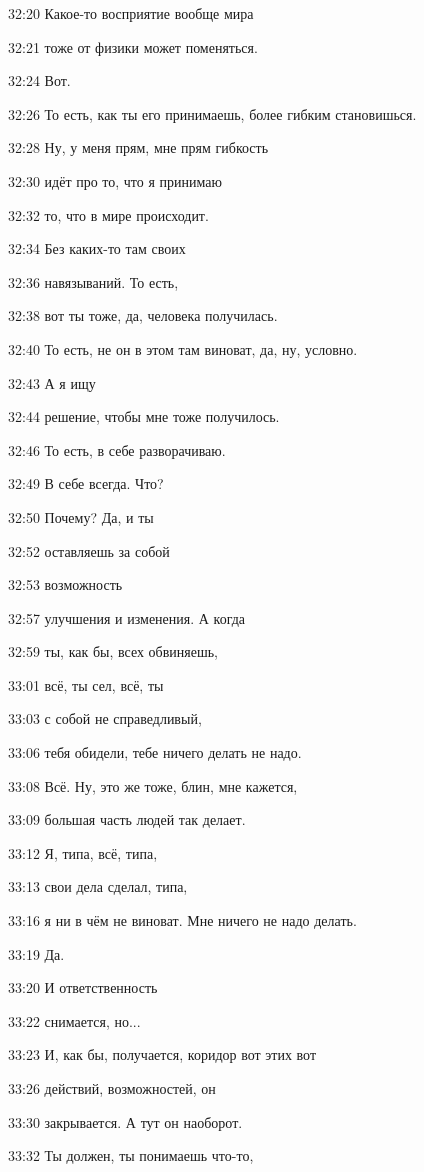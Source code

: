 32:20
Какое-то восприятие вообще мира

32:21
тоже от физики может поменяться.

32:24
Вот.

32:26
То есть, как ты его принимаешь, более гибким становишься.

32:28
Ну, у меня прям, мне прям гибкость

32:30
идёт про то, что я принимаю

32:32
то, что в мире происходит.

32:34
Без каких-то там своих

32:36
навязываний. То есть,

32:38
вот ты тоже, да, человека получилась.

32:40
То есть, не он в этом там виноват, да, ну, условно.

32:43
А я ищу

32:44
решение, чтобы мне тоже получилось.

32:46
То есть, в себе разворачиваю.

32:49
В себе всегда. Что?

32:50
Почему? Да, и ты

32:52
оставляешь за собой

32:53
возможность

32:57
улучшения и изменения. А когда

32:59
ты, как бы, всех обвиняешь,

33:01
всё, ты сел, всё, ты

33:03
с собой не справедливый,

33:06
тебя обидели, тебе ничего делать не надо.

33:08
Всё. Ну, это же тоже, блин, мне кажется,

33:09
большая часть людей так делает.

33:12
Я, типа, всё, типа,

33:13
свои дела сделал, типа,

33:16
я ни в чём не виноват. Мне ничего не надо делать.

33:19
Да.

33:20
И ответственность

33:22
снимается, но...

33:23
И, как бы, получается, коридор вот этих вот

33:26
действий, возможностей, он

33:30
закрывается. А тут он наоборот.

33:32
Ты должен, ты понимаешь что-то,

